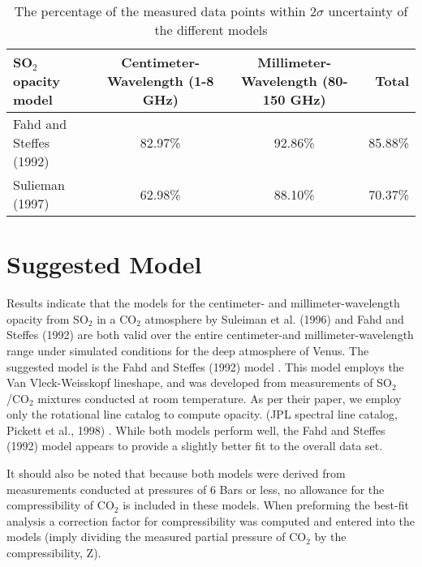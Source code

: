 \begin{sidewaystable}[p]

\caption{The percentage of the measured data points within $2\sigma$ uncertainty of the different models}
  \begin{tabular}{l | c c | r}
  \hline
  \hline
  SO$_2$ opacity model & Centimeter-Wavelength (1-8 GHz) & Millimeter-Wavelength (80-150 GHz) &Total\\
  \hline
  Fahd and Steffes (1992)	 & 82.97\%	& 	92.86\%& 85.88\%\\
  Sulieman (1997)& 62.98\%	&	88.10\%&70.37\%\\
  \hline
  \hline
  \end{tabular}
  \label{tab:model-comp}
\end{sidewaystable} 

\section{Suggested Model}
Results indicate that the models for the centimeter- and millimeter-wavelength opacity from SO$_2$ in a CO$_2$ atmosphere by Suleiman et al. (1996) and Fahd and Steffes (1992) are both valid over the entire centimeter-and millimeter-wavelength range under simulated conditions for the deep atmosphere of Venus. The suggested model is the Fahd and Steffes (1992) \cite{Fahd-thesis} model . This model employs the Van Vleck-Weisskopf lineshape, and was developed from measurements of SO$_2$/CO$_2$ mixtures conducted at room temperature. As per their paper, we employ only the rotational line catalog to compute opacity. (JPL spectral line catalog, Pickett et al., 1998) \cite{JPL_linecat}. While both models perform well, the Fahd and Steffes (1992) model appears to provide a slightly better fit to the overall data set. 

It should also be noted that because both models were derived from measurements conducted at pressures of 6 Bars or less, no allowance for the compressibility of CO$_2$ is included in these models. When preforming the best-fit analysis a correction factor for compressibility was computed and entered into the models (imply dividing the measured partial pressure of CO$_2$ by the compressibility, Z). 

